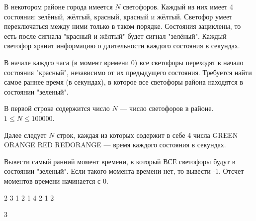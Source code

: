 
В некотором районе города имеется $N$ светофоров. Каждый из них имеет 4 состояния: зелёный, жёлтый, красный, красный и жёлтый. Светофор умеет переключаться между ними только в таком порядке. Состояния зациклены, то есть после сигнала "красный и жёлтый" будет сигнал "зелёный". Каждый светофор хранит информацию о длительности каждого состояния в секундах.

В начале каждго часа (в момент времени 0) все светофоры переходят в начало состояния "красный", независимо от их предыдущего состояния. Требуется найти самое раннее время (в секундах), в которое все светофоры района находятся в состоянии "зеленый".


В первой строке содержится число $N$ — число светофоров в районе. $1 \leq N \leq 100000$.

Далее следует $N$ строк, каждая из которых содержит в себе 4 числа GREEN ORANGE RED REDORANGE — время каждого состояния в секундах.

\outputfmtSection

Вывести самый ранний момент времени, в который ВСЕ светофоры будут в состоянии "зеленый". Если такого момента времени нет, то вывести -1. Отсчет моментов времени начинается с 0.


\begin{myverbbox}[\small]{\vinput}
    2 
    3 1 2 1 
    4 2 1 2 
\end{myverbbox}
\begin{myverbbox}[\small]{\voutput}
    3
\end{myverbbox}

